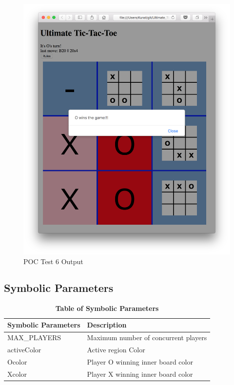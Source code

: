 \documentclass[12pt, titlepage]{article}
\begin{document}
\begin{figure}
  \includegraphics[width=\linewidth]{Figures/Test6-output.png}
  \caption{POC Test 6 Output}
  \label{fig:Test6_output}
\end{figure}

\subsection{Symbolic Parameters}

\begin{table}[hbp]
\caption{\textbf{Table of Symbolic Parameters}} \label{TableSP}

\begin{tabularx}{\textwidth}{p{5cm}X}
\toprule
\textbf{Symbolic Parameters} & \textbf{Description} \\
\midrule
MAX\_PLAYERS & Maximum number of concurrent players\\
activeColor & Active region Color\\
Ocolor &Player O winning inner board color\\
Xcolor & Player X winning inner board color\\
\bottomrule
\end{tabularx}

\end{table}
\end{document}
